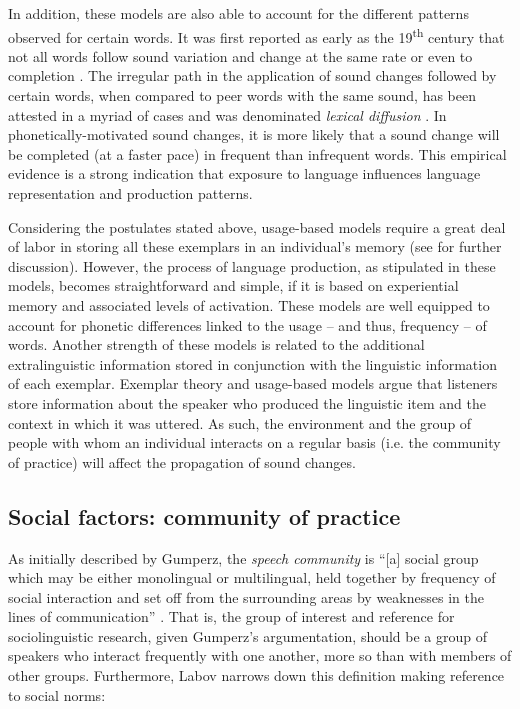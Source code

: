 \documentclass[output=paper,colorlinks,citecolor=brown,
]{langscibook}
\begin{document}
In addition, these models are also able to account for the different patterns observed for certain words. It was first reported as early as the 19\textsuperscript{th} century that not all words follow sound variation and change at the same rate or even to completion \citep{schuchardt1885lautgesetze}. The irregular path in the application of sound changes followed by certain words, when compared to peer words with the same sound, has been attested in a myriad of cases and was denominated \textit{lexical diffusion} \citep{phillips1984word,phillips1999mental,bybee2000phonology}. In phonetically-motivated sound changes, it is more likely that a sound change will be completed (at a faster pace) in frequent than infrequent words. This empirical evidence is a strong indication that exposure to language influences language representation and production patterns.

Considering the postulates stated above, usage-based models require a great deal of labor in storing all these exemplars in an individual's memory (see \citeauthor[140]{pierrehumbert2001exemplar} for further discussion). However, the process of language production, as stipulated in these models, becomes straightforward and simple, if it is based on experiential memory and associated levels of activation. These models are well equipped to account for phonetic differences linked to the usage -- and thus, frequency -- of words. Another strength of these models is related to the additional extralinguistic information stored in conjunction with the linguistic information of each exemplar. Exemplar theory and usage-based models argue that listeners store information about the speaker who produced the linguistic item and the context in which it was uttered. As such, the environment and the group of people with whom an individual interacts on a regular basis (i.e. the community of practice) will affect the propagation of sound changes.

\subsection{Social factors: community of practice}

As initially described by Gumperz, the \textit{speech community} is ``[a] social group which may be either monolingual or multilingual, held together by frequency of social interaction and set off from the surrounding areas by weaknesses in the lines of communication'' \citep[101]{gumperz1971language}. That is, the group of interest and reference for sociolinguistic research, given Gumperz's argumentation, should be a group of speakers who interact frequently with one another, more so than with members of other groups. Furthermore, Labov narrows down this definition making reference to social norms: 
\end{document}
